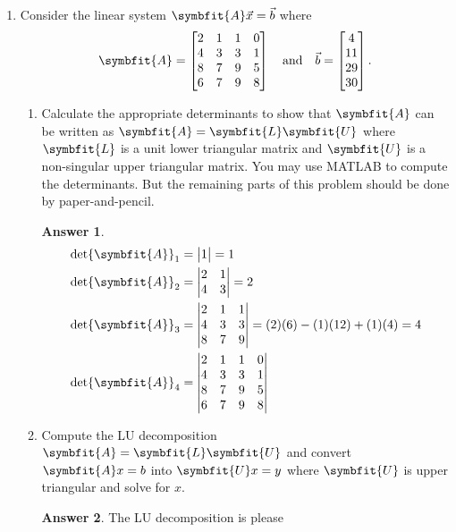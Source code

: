 \documentclass{article}
\theoremstyle{definition}
\newtheorem*{answer}{Answer}
\newcommand{\mat}[1]{\symbfit{#1}}
\begin{document}
\begin{enumerate}[leftmargin=\labelsep]
	\item Consider the linear system \(\mat{A}\vec{x} = \vec{b}\) where
	      \[
		      \mat{A} = \begin{bmatrix}
			      2 & 1 & 1 & 0 \\
			      4 & 3 & 3 & 1 \\
			      8 & 7 & 9 & 5 \\
			      6 & 7 & 9 & 8
		      \end{bmatrix}
		      \quad \text{and} \quad
		      \vec{b} = \begin{bmatrix}
			      4 \\ 11 \\ 29 \\ 30
		      \end{bmatrix}.
	      \]
	      \begin{enumerate}
		      \item Calculate the appropriate determinants to show that \(\mat{A}\) can be written as \(\mat{A} = \mat{L}\mat{U}\) where \(\mat{L}\) is a unit lower triangular matrix and \(\mat{U}\) is a non-singular upper triangular matrix. You may use MATLAB to compute the determinants. But the remaining parts of this problem should be done by paper-and-pencil.
		            \begin{answer}
			            \begin{align*}
				            \det\mat{A}_1 & = \mqty|1| = 1             \\
				            \det\mat{A}_2 & = \mqty|2      & 1         \\ 4 & 3| = 2 \\
				            \det\mat{A}_3 & = \mqty|2      & 1 & 1     \\ 4 & 3 & 3 \\ 8 & 7 & 9| = (2)(6)-(1)(12)+(1)(4) = 4 \\
				            \det\mat{A}_4 & = \mqty|2      & 1 & 1 & 0 \\ 4 & 3 & 3 & 1 \\ 8 & 7 & 9 & 5 \\ 6 & 7 & 9 & 8|
			            \end{align*}
		            \end{answer}

		      \item Compute the LU decomposition \(\mat{A} = \mat{L}\mat{U}\) and convert \(\mat{A}x = b\) into \(\mat{U}x = y\) where \(\mat{U}\) is upper triangular and solve for \(x\).
		            \begin{answer}
			            The LU decomposition is please
		            \end{answer}


\end{enumerate}
\end{enumerate}
\end{document}
